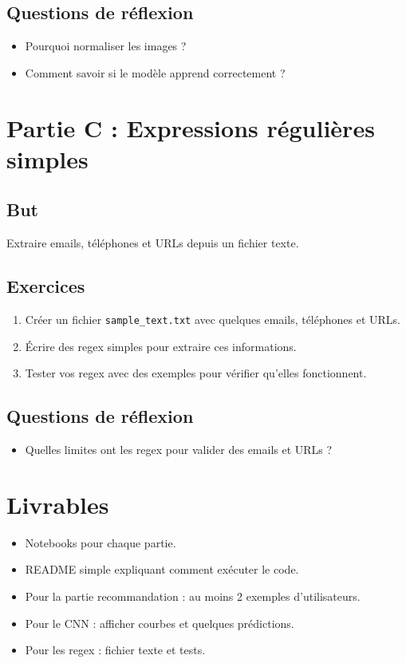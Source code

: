 \documentclass[a4paper,12pt]{article}
\begin{document}
\subsection*{Questions de réflexion}
\begin{itemize}
\item Pourquoi normaliser les images ?
\item Comment savoir si le modèle apprend correctement ?
\end{itemize}

\section*{Partie C : Expressions régulières simples}
\subsection*{But}
Extraire emails, téléphones et URLs depuis un fichier texte.

\subsection*{Exercices}
\begin{enumerate}
\item Créer un fichier \texttt{sample\_text.txt} avec quelques emails, téléphones et URLs.
\item Écrire des regex simples pour extraire ces informations.
\item Tester vos regex avec des exemples pour vérifier qu'elles fonctionnent.
\end{enumerate}

\subsection*{Questions de réflexion}
\begin{itemize}
\item Quelles limites ont les regex pour valider des emails et URLs ?
\end{itemize}

\section*{Livrables}
\begin{itemize}
\item Notebooks pour chaque partie.
\item README simple expliquant comment exécuter le code.
\item Pour la partie recommandation : au moins 2 exemples d'utilisateurs.
\item Pour le CNN : afficher courbes et quelques prédictions.
\item Pour les regex : fichier texte et tests.
\end{itemize}
\end{document}
